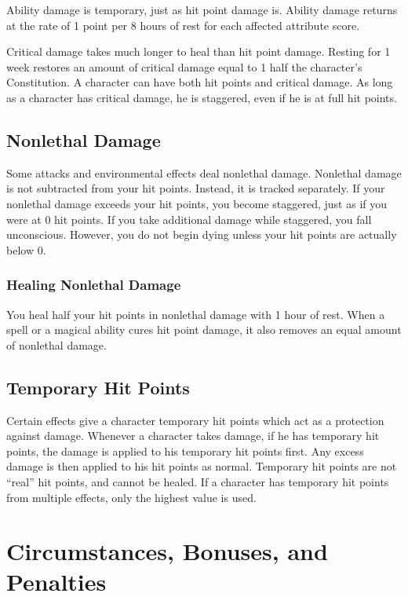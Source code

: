  Ability damage is temporary, just as hit point damage is. Ability damage returns at the rate of 1 point per 8 hours of rest for each affected attribute score.

 Critical damage takes much longer to heal than hit point damage. Resting for 1 week restores an amount of critical damage equal to 1 \add half the character's Constitution. A character can have both hit points and critical damage. As long as a character has critical damage, he is staggered, even if he is at full hit points.

\subsection{Nonlethal Damage}\label{Nonlethal Damage}
Some attacks and environmental effects deal nonlethal damage. Nonlethal damage is not subtracted from your hit points. Instead, it is tracked separately. If your nonlethal damage exceeds your hit points, you become staggered, just as if you were at 0 hit points. If you take additional damage while staggered, you fall unconscious. However, you do not begin dying unless your hit points are actually below 0. 

\subsubsection{Healing Nonlethal Damage}
You heal half your hit points in nonlethal damage with 1 hour of rest. When a spell or a magical ability cures hit point damage, it also removes an equal amount of nonlethal damage.

\subsection{Temporary Hit Points}\label{Temporary Hit Points}
Certain effects give a character temporary hit points which act as a protection against damage. Whenever a character takes damage, if he has temporary hit points, the damage is applied to his temporary hit points first. Any excess damage is then applied to his hit points as normal. Temporary hit points are not ``real'' hit points, and cannot be healed. If a character has temporary hit points from multiple effects, only the highest value is used.

\section{Circumstances, Bonuses, and Penalties}

